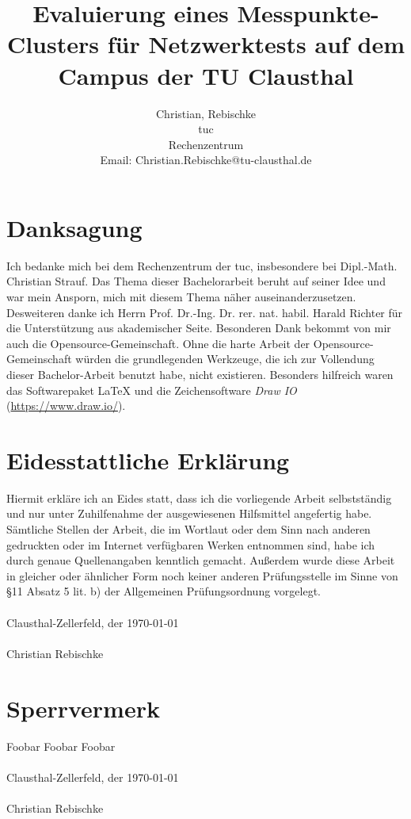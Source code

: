 \documentclass[titlepage]{report}
\title{Evaluierung eines Messpunkte-Clusters für Netzwerktests auf dem
Campus der TU Clausthal}
\author{Christian, Rebischke\\
\gls{tuc}\\
Rechenzentrum\\
Email: Christian.Rebischke@tu-clausthal.de}
\begin{document}
\maketitle
\chapter*{Danksagung}
Ich bedanke mich bei dem Rechenzentrum der \gls{tuc}, insbesondere bei
Dipl.\hyp{}Math. Christian Strauf. Das Thema dieser Bachelorarbeit
beruht auf seiner Idee und war mein Ansporn, mich mit diesem Thema näher
auseinanderzusetzen. Desweiteren danke ich Herrn Prof. Dr.\hyp{}Ing. Dr.
rer. nat. habil. Harald Richter für die Unterstützung aus akademischer
Seite. Besonderen Dank bekommt von mir auch die
Opensource\hyp{}Gemeinschaft.  Ohne die harte Arbeit der
Opensource\hyp{}Gemeinschaft würden die grundlegenden Werkzeuge, die
ich zur Vollendung dieser Bachelor-Arbeit benutzt habe, nicht
existieren. Besonders hilfreich waren das Softwarepaket \LaTeX{} und die
Zeichensoftware \emph{Draw IO} (\url{https://www.draw.io/}).
\chapter*{Eidesstattliche Erklärung}
Hiermit erkläre ich an Eides statt, dass ich die vorliegende Arbeit
selbstständig und nur unter Zuhilfenahme der ausgewiesenen Hilfsmittel
angefertig habe. Sämtliche Stellen der Arbeit, die im Wortlaut oder dem
Sinn nach anderen gedruckten oder im Internet verfügbaren Werken
entnommen sind, habe ich durch genaue Quellenangaben kenntlich gemacht.
Außerdem wurde diese Arbeit in gleicher oder ähnlicher Form noch keiner
anderen Prüfungsstelle im Sinne von \S 11 Absatz 5 lit. b) der
Allgemeinen Prüfungsordnung vorgelegt.
\\
\\
Clausthal-Zellerfeld, der \today
\\
\\
Christian Rebischke
\chapter*{Sperrvermerk}
Foobar Foobar Foobar
\\
\\
Clausthal-Zellerfeld, der \today
\\
\\
Christian Rebischke
\tableofcontents
\end{document}
